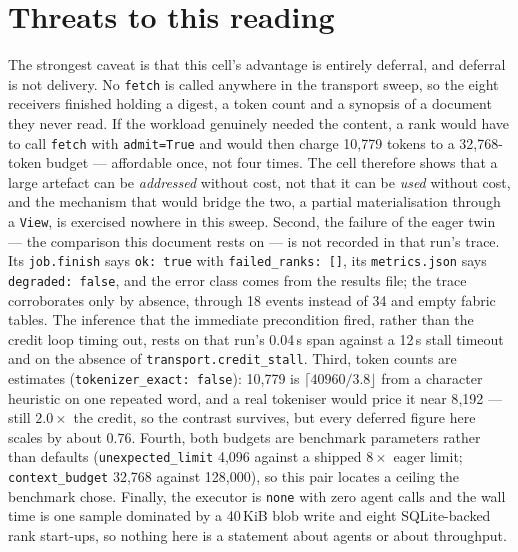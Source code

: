 \documentclass[11pt]{article}
\begin{document}
\section{Threats to this reading}

The strongest caveat is that this cell's advantage is entirely deferral, and deferral
is not delivery. No \texttt{fetch} is called anywhere in the transport sweep, so the
eight receivers finished holding a digest, a token count and a synopsis of a document
they never read. If the workload genuinely needed the content, a rank would have to
call \texttt{fetch} with \texttt{admit=True} and would then charge 10{,}779 tokens to
a 32{,}768-token budget --- affordable once, not four times. The cell therefore shows
that a large artefact can be \emph{addressed} without cost, not that it can be
\emph{used} without cost, and the mechanism that would bridge the two, a partial
materialisation through a \texttt{View}, is exercised nowhere in this sweep. Second,
the failure of the eager twin --- the comparison this document rests on --- is not
recorded in that run's trace. Its \texttt{job.finish} says \texttt{ok: true} with
\texttt{failed\_ranks: []}, its \texttt{metrics.json} says \texttt{degraded: false},
and the error class comes from the results file; the trace corroborates only by
absence, through 18 events instead of 34 and empty fabric tables. The inference that
the immediate precondition fired, rather than the credit loop timing out, rests on
that run's 0.04\,s span against a 12\,s stall timeout and on the absence of
\texttt{transport.credit\_stall}. Third, token counts are estimates
(\texttt{tokenizer\_exact: false}): 10{,}779 is $\lceil 40960/3.8 \rfloor$ from a
character heuristic on one repeated word, and a real tokeniser would price it near
8{,}192 --- still $2.0\times$ the credit, so the contrast survives, but every
deferred figure here scales by about $0.76$. Fourth, both budgets are benchmark
parameters rather than defaults (\texttt{unexpected\_limit} 4{,}096 against a shipped
$8\times$ eager limit; \texttt{context\_budget} 32{,}768 against 128{,}000), so this
pair locates a ceiling the benchmark chose. Finally, the executor is \texttt{none}
with zero agent calls and the wall time is one sample dominated by a 40\,KiB blob
write and eight SQLite-backed rank start-ups, so nothing here is a statement about
agents or about throughput.
\end{document}
